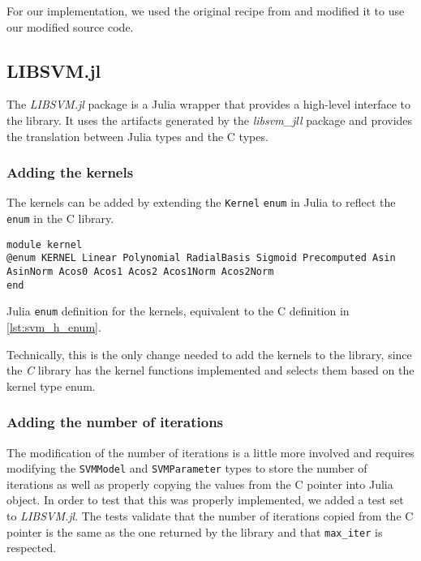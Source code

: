 For our implementation, we used the original recipe from
\textcite{LibsvmJllJl2022} and modified it to use our modified \libsvm
source code.

\subsection{LIBSVM.jl}

The \emph{LIBSVM.jl} package \cite{LIBSVMJl2023} is a Julia wrapper that
provides a high-level interface to the \libsvm library. It uses the artifacts
generated by the \emph{libsvm\_jll} package and provides the
translation between Julia types and the C types.

\subsubsection{Adding the kernels}

The kernels can be added by extending the \texttt{Kernel} \texttt{enum} in Julia
to reflect the \texttt{enum} in the C library.
\begin{listing}[H]
    \begin{verbatim}
module kernel
@enum KERNEL Linear Polynomial RadialBasis Sigmoid Precomputed Asin AsinNorm Acos0 Acos1 Acos2 Acos1Norm Acos2Norm
end
\end{verbatim}
    \caption{Julia \texttt{enum} definition for the kernels, equivalent to the C definition in \cref{lst:svm_h_enum}.}
    \label{lst:kernel_enum_julia}
\end{listing}

Technically, this is the only change needed to add the kernels to the library,
since the \emph{C} library has the kernel functions implemented and selects them
based on the kernel type enum.

\subsubsection{Adding the number of iterations}

The modification of the number of iterations is a little more involved and
requires modifying the \texttt{SVMModel} and \texttt{SVMParameter} types to
store the number of iterations as well as properly copying the values from the C
pointer into Julia object. In order to test that this was properly implemented,
we added a test set to \emph{LIBSVM.jl}. The tests validate that the number of
iterations copied from the C pointer is the same as the one returned by the
\libsvm library and that \texttt{max\_iter} is respected.

